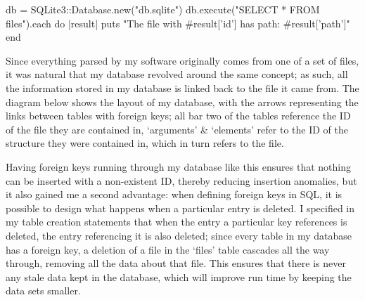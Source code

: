     \begin{code}[language=ruby, gobble=6]
      db = SQLite3::Database.new("db.sqlite")
      db.execute("SELECT * FROM files").each do |result|
        puts "The file with #{result['id']} has path: #{result['path']}"
      end
    \end{code}

    Since everything parsed by my software originally comes from one of a set
    of files, it was natural that my database revolved around the same
    concept; as such, all the information stored in my database is linked back
    to the file it came from. The diagram below shows the layout of my
    database, with the arrows representing the links between tables with foreign
    keys; all bar two of the tables reference the ID of the file they are
    contained in, `arguments' \& `elements' refer to the ID of the structure
    they were contained in, which in turn refers to the file.

    \noindent{}

    Having foreign keys running through my database like this ensures that
    nothing can be inserted with a non-existent ID, thereby reducing insertion
    anomalies, but it also gained me a second advantage: when defining foreign
    keys in SQL, it is possible to design what happens when a particular entry
    is deleted. I specified in my table creation statements that when the
    entry a particular key references is deleted, the entry referencing it is
    also deleted; since every table in my database has a foreign key, a
    deletion of a file in the `files' table cascades all the way through,
    removing all the data about that file. This ensures that there is never
    any stale data kept in the database, which will improve run time by
    keeping the data sets smaller.

